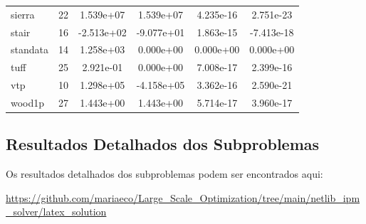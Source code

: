 \documentclass[12pt,a4paper]{article}
\begin{document}
\begin{longtable}{@{}l|ccccc@{}}
sierra & 22 & 1.539e+07 & 1.539e+07 & 4.235e-16 & 2.751e-23 \\
stair & 16 & -2.513e+02 & -9.077e+01 & 1.863e-15 & -7.413e-18 \\
standata & 14 & 1.258e+03 & 0.000e+00 & 0.000e+00 & 0.000e+00 \\
tuff & 25 & 2.921e-01 & 0.000e+00 & 7.008e-17 & 2.399e-16 \\
vtp & 10 & 1.298e+05 & -4.158e+05 & 3.362e-16 & 2.590e-21 \\
wood1p & 27 & 1.443e+00 & 1.443e+00 & 5.714e-17 & 3.960e-17 \\

\bottomrule
\end{longtable}


\subsection{Resultados Detalhados dos Subproblemas}

Os resultados detalhados dos subproblemas podem ser encontrados aqui: 

\url{https://github.com/mariaeco/Large_Scale_Optimization/tree/main/netlib_ipm_solver/latex_solution}
\end{document}
